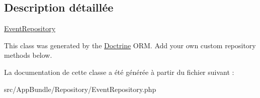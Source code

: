 \subsection{Description détaillée}
\hyperlink{classAppBundle_1_1Repository_1_1EventRepository}{Event\+Repository}

This class was generated by the \hyperlink{namespaceAppBundle_1_1Doctrine}{Doctrine} O\+RM. Add your own custom repository methods below. 

La documentation de cette classe a été générée à partir du fichier suivant \+:\begin{DoxyCompactItemize}
\item 
src/\+App\+Bundle/\+Repository/Event\+Repository.\+php\end{DoxyCompactItemize}
